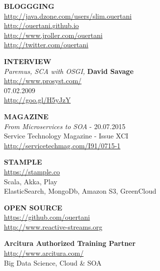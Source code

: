 \documentclass[10pt,a4paper]{article}
\begin{document}
\begin{multicols}{2}
{\bf  BLOGGGING } \\                                   
\url{http://java.dzone.com/users/slim.ouertani}  \\          
\url{http://ouertani.github.io}     \\                     
\url{http://www.jroller.com/ouertani}  \\                    
\url{http://twitter.com/ouertani}                         

\columnbreak
{\bf INTERVIEW } \\
{\sl Paremus, SCA with OSGI,} {\bf David Savage}  \\
\url{http://www.prosyst.com/} \\
07.02.2009 \\
\url{http://goo.gl/H5yJzY}
\end{multicols}


\begin{multicols}{2}
{\bf  MAGAZINE} \\
{\sl From Microservices to SOA} -  20.07.2015 \\
Service Technology Magazine     -  Issue XCI \\
\url{http://servicetechmag.com/I91/0715-1}  \\

\columnbreak

{\bf STAMPLE } \\
\url{https://stample.co}\\
Scala, Akka, Play \\
ElasticSearch, MongoDb, Amazon S3, GreenCloud
\end{multicols}

\begin{multicols}{2}
{\bf  OPEN SOURCE } \\
\url{https://github.com/ouertani}  \\
\url{http://www.reactive-streams.org}

{\bf  Arcitura Authorized Training Partner } \\
\url{http://www.arcitura.com/}  \\
Big Data Science, Cloud \& SOA
\end{multicols}

\spacedhrule{0em}{-0.4em}

\end{document}
